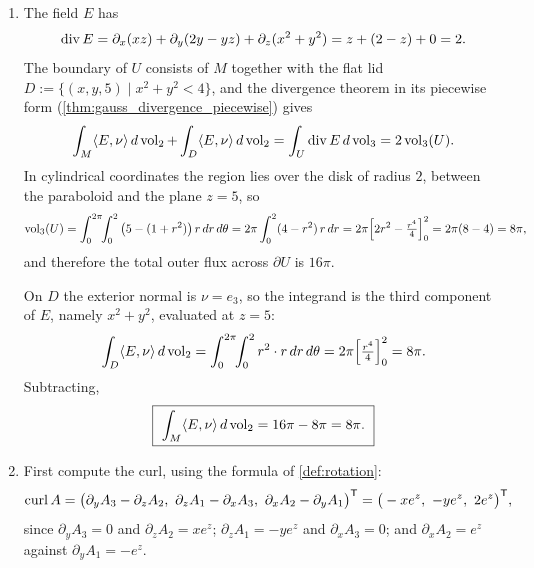\begin{exercisesolution}
\begin{enumerate}[label=\textbf{(\alph*)}]
\begin{center}
\end{center}

  \item The field $E$ has
    \[\operatorname{div} E = \partial_x(xz) + \partial_y(2y-yz) + \partial_z(x^2+y^2) = z + (2-z) + 0 = 2 .\]
    The boundary of $U$ consists of $M$ together with the flat lid
    $D := \{(x,y,5) \mid x^2+y^2 < 4\}$, and the divergence theorem in its piecewise form
    (\cref{thm:gauss_divergence_piecewise}) gives
    \[\int_M \langle E,\nu\rangle\,d\operatorname{vol}_2 + \int_D \langle E,\nu\rangle\,d\operatorname{vol}_2
      = \int_U \operatorname{div} E\,d\operatorname{vol}_3 = 2\operatorname{vol}_3(U).\]
    In cylindrical coordinates the region lies over the disk of radius $2$, between the paraboloid
    and the plane $z=5$, so
    \[\operatorname{vol}_3(U) = \int_0^{2\pi}\!\!\int_0^2 \big(5 - (1+r^2)\big)\,r\,dr\,d\theta
      = 2\pi\int_0^2 (4-r^2)\,r\,dr = 2\pi\Big[2r^2 - \tfrac{r^4}{4}\Big]_0^2
      = 2\pi(8-4) = 8\pi,\]
    and therefore the total outer flux across $\partial U$ is $16\pi$.

    On $D$ the exterior normal is $\nu = e_3$, so the integrand is the third component of $E$,
    namely $x^2+y^2$, evaluated at $z=5$:
    \[\int_D \langle E,\nu\rangle\,d\operatorname{vol}_2 = \int_0^{2\pi}\!\!\int_0^2 r^2\cdot r\,dr\,d\theta
      = 2\pi\Big[\tfrac{r^4}{4}\Big]_0^2 = 8\pi .\]
    Subtracting,
    \[\boxed{\ \int_M \langle E,\nu\rangle\,d\operatorname{vol}_2 = 16\pi - 8\pi = 8\pi.\ }\]

  \item First compute the curl, using the formula of \cref{def:rotation}:
    \[\curl A = \big(\partial_yA_3 - \partial_zA_2,\ \partial_zA_1 - \partial_xA_3,\
      \partial_xA_2 - \partial_yA_1\big)\transp
      = \big(-xe^z,\ -ye^z,\ 2e^z\big)\transp,\]
    since $\partial_yA_3 = 0$ and $\partial_zA_2 = xe^z$; $\partial_zA_1 = -ye^z$ and
    $\partial_xA_3 = 0$; and $\partial_xA_2 = e^z$ against $\partial_yA_1 = -e^z$.


\end{enumerate}
\end{exercisesolution}
